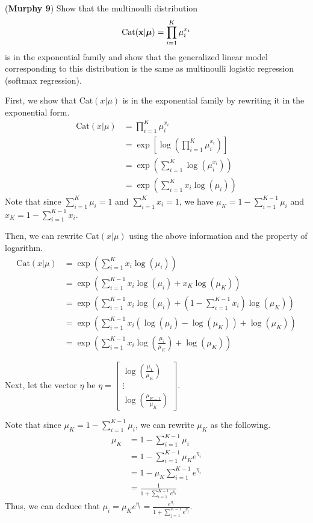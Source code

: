\documentclass[12pt,letterpaper,fleqn]{hmcpset}
\begin{document}
\begin{problem}[2]
(\textbf{Murphy 9}) Show that the multinoulli distribution
\[
    \text{Cat}({\bf x}|\hbox{\boldmath$\mu$}) = \prod_{i=1}^K \mu_i^{x_i}
\]
is in the exponential family and show that the generalized linear model
corresponding to this distribution is the same as multinoulli logistic
regression (softmax regression).
\end{problem}
\begin{solution}
First, we show that $\text{Cat}(x|\mu)$ is in the exponential family by rewriting it in the exponential form.
\begin{align*}
\text{Cat}(x|\mu) &= \prod_{i=1}^{K} \mu_i^{x_i} \\
&= \exp \left[ \log \left( \prod_{i=1}^{K} \mu_i^{x_i} \right) \right] \\
&= \exp \left( \sum_{i=1}^{K} \log(\mu_i^{x_i}) \right) \\
&= \exp \left( \sum_{i=1}^{K} x_i \log(\mu_i) \right)
\end{align*}
Note that since $\sum_{i=1}^{K} \mu_i = 1$ and $\sum_{i=1}^{K} x_i = 1$, we have $\mu_K = 1 - \sum_{i=1}^{K-1} \mu_i$ and $x_K = 1 - \sum_{i=1}^{K-1} x_i$.

Then, we can rewrite $\text{Cat}(x|\mu)$ using the above information and the property of logarithm.
\begin{align*}
\text{Cat}(x|\mu) &= \exp \left( \sum_{i=1}^{K} x_i \log(\mu_i) \right) \\
&= \exp \left( \sum_{i=1}^{K-1} x_i \log(\mu_i) + x_K \log(\mu_K) \right) \\
&= \exp \left( \sum_{i=1}^{K-1} x_i \log(\mu_i) + \left( 1 - \sum_{i=1}^{K-1} x_i \right) \log(\mu_K) \right) \\
&= \exp \left( \sum_{i=1}^{K-1} x_i (\log(\mu_i) - \log(\mu_K)) + \log(\mu_K) \right) \\
&= \exp \left( \sum_{i=1}^{K-1} x_i \log\left(\frac{\mu_i}{\mu_K}\right) + \log(\mu_K) \right)
\end{align*}

Next, let the vector $\eta$ be
$
\eta =
\begin{bmatrix}
\log\left(\frac{\mu_1}{\mu_K}\right) \\
\vdots \\
\log\left(\frac{\mu_{K-1}}{\mu_K}\right)
\end{bmatrix}
$.

Note that since $\mu_K = 1 - \sum_{i=1}^{K-1} \mu_i$, we can rewrite $\mu_K$ as the following.
\begin{align*}
\mu_K &= 1 - \sum_{i=1}^{K-1} \mu_i \\
&= 1 - \sum_{i=1}^{K-1} \mu_K e^{\eta_i} \\
&= 1 - \mu_K \sum_{i=1}^{K-1} e^{\eta_i} \\
&= \frac{1}{1 + \sum_{i=1}^{K-1} e^{\eta_i}}
\end{align*}
Thus, we can deduce that
$
\mu_i = \mu_K e^{\eta_i} = \frac{e^{\eta_i}}{1 + \sum_{j=1}^{K-1} e^{\eta_j}}
$.


\end{solution}
\end{document}
